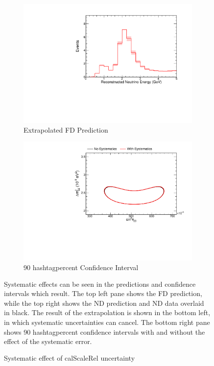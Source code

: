{\begin{figure}
\begin{center}
\begin{subfigure}[c]{0.49\textwidth}
\includegraphics[width=\textwidth]{figures/systs/prediction/fd_extrap_prediction_calScaleRel.pdf}
\caption*{Extrapolated FD Prediction}
\end{subfigure}
\begin{subfigure}[c]{0.49\textwidth}
\includegraphics[width=\textwidth]{figures/systs/prediction/fd_extrap_contour_calScaleRel.pdf}
\caption*{90 hashtagpercent Confidence Interval}
\end{subfigure}
\end{center}
\caption{Systematic effect of calScaleRel uncertainty}{
Systematic effects can be seen in the predictions and confidence intervals
which result.
The top left pane shows the FD prediction, while the top right shows the
ND prediction and ND data overlaid in black.
The result of the extrapolation is shown in the bottom left, in which
systematic uncertainties can cancel.
The bottom right pane shows 90 hashtagpercent confidence intervals with and without
the effect of the systematic error.}
\label{syst_fig_calScaleRel}


\end{figure}}
